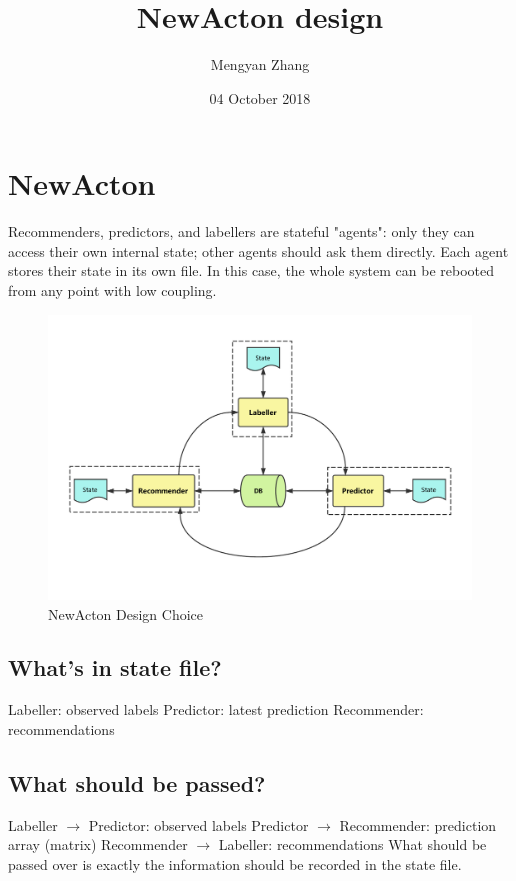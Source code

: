 \documentclass[11pt,twoside]{article}
\title{NewActon design}
\author{Mengyan Zhang}
\date{04 October 2018}
\begin{document}
\maketitle

\section*{NewActon}

Recommenders, predictors, and labellers are stateful "agents": only they can access their own internal state; other agents should ask them directly. Each agent stores their state in its own file. In this case, the whole system can be rebooted from any point with low coupling.  
 
 \begin{figure}[h]
     \centering
     \includegraphics[scale = 0.7]{docs/design/acton.pdf}
     \caption{NewActon Design Choice}
     \label{fig:my_label}
 \end{figure}

\subsection*{What's in state file?}

Labeller: observed labels \newline
Predictor: latest prediction \newline   
Recommender: recommendations

\subsection*{What should be passed?}

Labeller $\rightarrow$ Predictor: observed labels \newline
Predictor $\rightarrow$ Recommender: prediction array (matrix) \newline
Recommender $\rightarrow$ Labeller: recommendations \newline
What should be passed over is exactly the information should be recorded in the state file.
\end{document}
